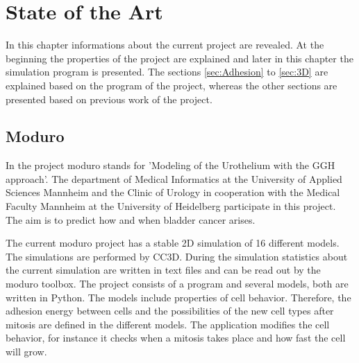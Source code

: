 \chapter{State of the Art}
In this chapter informations about the current project are revealed. At the beginning the properties of the project are explained and later in this chapter the simulation program is presented. The sections \ref{sec:Adhesion} to \ref{sec:3D} are explained based on the program of the project, whereas the other sections are presented based on previous work of the project.

\section{Moduro}
In the project moduro stands for 'Modeling of the Urothelium with the \ac{GGH} approach'. The department of Medical Informatics at the University of Applied Sciences Mannheim and the Clinic of Urology in cooperation with the Medical Faculty Mannheim at the University of Heidelberg participate in this project. The aim is to predict how and when bladder cancer arises.

The current moduro project has a stable 2D simulation of 16 different models. The simulations are performed by \ac{CC3D}. During the simulation statistics about the current simulation are written in text files and can be read out by the moduro toolbox. \newline
The project consists of a program and several models, both are written in Python. The models include properties of cell behavior. Therefore, the adhesion energy between cells and the possibilities of the new cell types after mitosis are defined in the different models. The application modifies the cell behavior, for instance it checks when a mitosis takes place and how fast the cell will grow.


